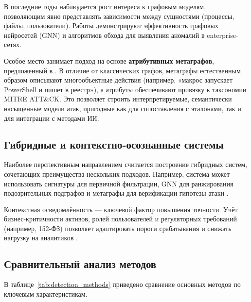 В последние годы наблюдается рост интереса к графовым моделям, позволяющим явно представлять зависимости между сущностями (процессы, файлы, пользователи). Работы \cite{Raghavan2022, arXiv2023} демонстрируют эффективность графовых нейросетей (GNN) и алгоритмов обхода для выявления аномалий в enterprise-сетях.

Особое место занимает подход на основе \textbf{атрибутивных метаграфов}, предложенный в \cite{Latypov2020}. В отличие от классических графов, метаграфы естественным образом описывают многообъектные действия (например, «макрос запускает PowerShell и пишет в реестр»), а атрибуты обеспечивают привязку к таксономии MITRE ATT\&CK. Это позволяет строить интерпретируемые, семантически насыщенные модели атак, пригодные как для сопоставления с эталонами, так и для интеграции с методами ИИ.

\subsection{Гибридные и контекстно-осознанные системы}

Наиболее перспективным направлением считается построение гибридных систем, сочетающих преимущества нескольких подходов. Например, система может использовать сигнатуры для первичной фильтрации, GNN для ранжирования подозрительных подграфов и метаграфы для верификации гипотезы атаки \cite{Alazab2016}.

Контекстная осведомлённость — ключевой фактор повышения точности. Учёт бизнес-критичности активов, ролей пользователей и регуляторных требований (например, 152-ФЗ) позволяет адаптировать пороги срабатывания и снижать нагрузку на аналитиков \cite{FSTEK2015, eccu2024}.

\subsection{Сравнительный анализ методов}

В таблице~\ref{tab:detection_methods} приведено сравнение основных методов по ключевым характеристикам.

